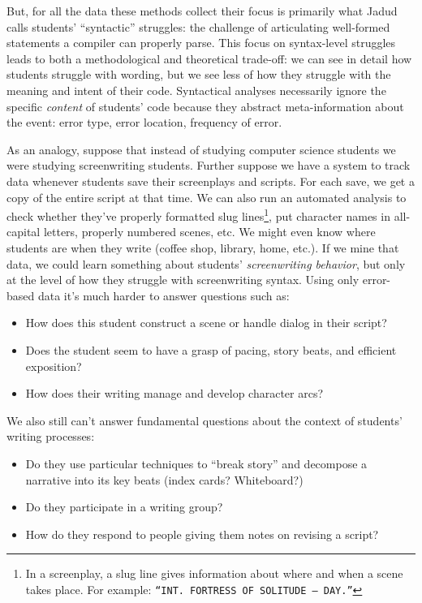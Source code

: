 But, for all the data these methods collect their focus is primarily
what Jadud \cite{jadud_methods_2006} calls students' ``syntactic'' struggles: the challenge
of articulating well-formed statements a compiler can properly parse.
This focus on syntax-level struggles leads to both a methodological and
theoretical trade-off: we can see in detail how students struggle with
wording, but we see less of how they struggle with the meaning and
intent of their code. Syntactical analyses necessarily ignore the
specific \emph{content} of students' code because they abstract
meta-information about the event: error type, error location, frequency
of error.

As an analogy, suppose that instead of studying computer science
students we were studying screenwriting students. Further suppose we
have a system to track data whenever students save their screenplays and
scripts. For each save, we get a copy of the entire script at that time.
We can also run an automated analysis to check whether they've properly
formatted slug lines\footnote{In a screenplay, a slug line gives
  information about where and when a scene takes place. For example:
  \texttt{``INT. FORTRESS OF SOLITUDE -- DAY.''}}, put character names in
all-capital letters, properly numbered scenes, etc. We might even know
where students are when they write (coffee shop, library, home, etc.).
If we mine that data, we could learn something about students'
\emph{screenwriting behavior}, but only at the level of how they
struggle with screenwriting syntax. Using only error-based data it's
much harder to answer questions such as:

\begin{itemize}
  \tightlist
\item
  How does this student construct a scene or handle dialog in their
  script?
\item
  Does the student seem to have a grasp of pacing, story beats, and
  efficient exposition?
\item
  How does their writing manage and develop character arcs?
\end{itemize}

We also still can't answer fundamental questions about the context of
students' writing processes:

\begin{itemize}
  \tightlist
\item
  Do they use particular techniques to ``break story'' and decompose a
  narrative into its key beats (index cards? Whiteboard?)
\item
  Do they participate in a writing group?
\item
  How do they respond to people giving them notes on revising a script?
\end{itemize}

